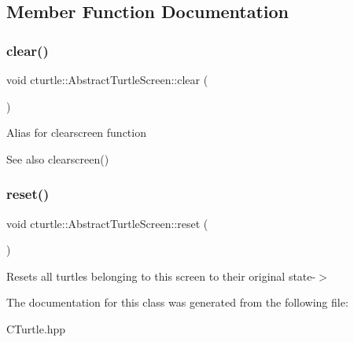 \subsection{Member Function Documentation}
\mbox{\label{classcturtle_1_1AbstractTurtleScreen_abae240a2ba949c1628bb01ad850fb32b}} 
\subsubsection{\texorpdfstring{clear()}{clear()}}
{\footnotesize\ttfamily void cturtle\+::\+Abstract\+Turtle\+Screen\+::clear (\begin{DoxyParamCaption}{ }\end{DoxyParamCaption})\hspace{0.3cm}{\ttfamily [inline]}}

Alias for clearscreen function \begin{DoxySeeAlso}{See also}
clearscreen() 
\end{DoxySeeAlso}
\mbox{\label{classcturtle_1_1AbstractTurtleScreen_ac791e1eca792e71c356006c96eb98788}} 
\subsubsection{\texorpdfstring{reset()}{reset()}}
{\footnotesize\ttfamily void cturtle\+::\+Abstract\+Turtle\+Screen\+::reset (\begin{DoxyParamCaption}{ }\end{DoxyParamCaption})\hspace{0.3cm}{\ttfamily [inline]}}

Resets all turtles belonging to this screen to their original state-\/$>$ 

The documentation for this class was generated from the following file\+:\begin{DoxyCompactItemize}
\item 
C\+Turtle.\+hpp\end{DoxyCompactItemize}
